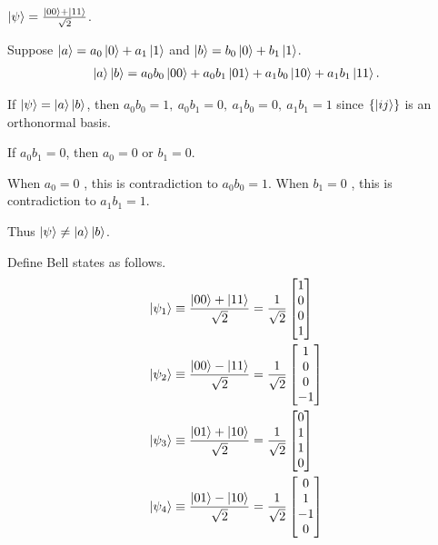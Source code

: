 
$\ket{\psi} = \frac{\ket{00} + \ket{11}}{\sqrt{2}}$.

Suppose $\ket{a} = a_0 \ket{0}  + a_1\ket{1}$ and $\ket{b} = b_0 \ket{0}  + b_1\ket{1}$.
%
\begin{align*}
    \ket{a} \ket{b} = a_0 b_0 \ket{00} + a_0 b_1 \ket{01} + a_1 b_0 \ket{10} + a_1 b_1 \ket{11}.
\end{align*}

If $\ket{\psi} = \ket{a} \ket{b}$, then $a_0 b_0 = 1,~ a_0 b_1=0,~ a_1 b_0 = 0,~ a_1 b_1 = 1$ since $\{\ket{ij}\}$ is an orthonormal basis.

If $a_0 b_1 = 0$, then $a_0 = 0$ or $b_1 = 0$.

When $a_0 = 0$ , this is contradiction to $a_0 b_0 = 1$.
When $b_1 = 0$ , this is contradiction to $a_1 b_1 = 1$.

Thus $\ket{\psi} \neq \ket{a} \ket{b}$.


Define Bell states as follows.
\begin{align*}
    \ket{\psi_1} &\equiv \frac{\ket{00} + \ket{11}}{\sqrt{2}} = \frac{1}{\sqrt{2}} \begin{bmatrix}
    1 \\
    0 \\
    0 \\
    1
    \end{bmatrix} \\
    \ket{\psi_2} &\equiv \frac{\ket{00} - \ket{11}}{\sqrt{2}} = \frac{1}{\sqrt{2}} \begin{bmatrix}
    1 \\
    0 \\
    0 \\
    -1
    \end{bmatrix} \\
    \ket{\psi_3} &\equiv \frac{\ket{01} + \ket{10}}{\sqrt{2}} = \frac{1}{\sqrt{2}} \begin{bmatrix}
    0 \\
    1 \\
    1 \\
    0
    \end{bmatrix} \\
    \ket{\psi_4} &\equiv \frac{\ket{01} - \ket{10}}{\sqrt{2}} = \frac{1}{\sqrt{2}} \begin{bmatrix}
    0 \\
    1 \\
    -1 \\
    0
    \end{bmatrix} \\
\end{align*}

